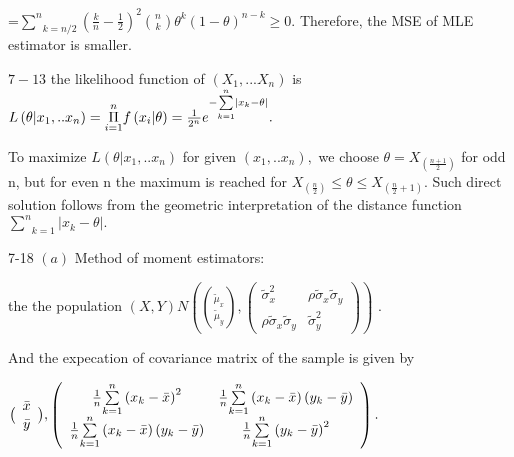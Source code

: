 \documentclass{article}
\begin{document}
=$\underset{k=n/2}{\overset{n}{\sum }}\left( \frac{k}{n}-\frac{1}{2}\right)
^{2}\binom{n}{k}\theta ^{k}\left( 1-\theta \right) ^{n-k}\geq 0.$ Therefore,
the MSE of MLE estimator is smaller.

$7-13$ the likelihood function of $\left( X_{1},...X_{n}\right) $ is $%
L\left( \theta |x_{1},..x_{n}\right) =\underset{i=1}{\overset{n}{\Pi }}%
f\left( x_{i}|\theta \right) =\frac{1}{2^{n}}e^{-\underset{k=1}{\overset{n}{%
\sum }}\left\vert x_{k}-\theta \right\vert }.$

To maximize $L\left( \theta |x_{1},..x_{n}\right) $ for given $\left(
x_{1},..x_{n}\right) ,$ we choose $\theta =X_{\left( \frac{n+1}{2}\right) }$
for odd n, but for even n the maximum is reached for $X_{\left( \frac{n}{2}%
\right) }\leq \theta \leq X_{\left( \frac{n}{2}+1\right) }.$ Such direct
solution follows from the geometric interpretation of the distance function $%
\underset{k=1}{\overset{n}{\sum }}\left\vert x_{k}-\theta \right\vert .$

7-18 $\left( a\right) $ Method of moment estimators: 

the the population $\left( X,Y\right) $$N\left( \binom{\tilde{\mu%
}_{x}}{\tilde{\mu}_{y}},\left( 
\begin{array}{cc}
\tilde{\sigma}_{x}^{2} & \rho \tilde{\sigma}_{x}\tilde{\sigma}_{y} \\ 
\rho \tilde{\sigma}_{x}\tilde{\sigma}_{y} & \tilde{\sigma}_{y}^{2}%
\end{array}%
\right) \right) $ .

And the expecation of covariance matrix of the sample is given by

$\binom{%
\begin{array}{c}
\bar{x} \\ 
\end{array}%
}{%
\begin{array}{c}
\bar{y} \\ 
\end{array}%
},\left( 
\begin{array}{cc}
\frac{1}{n}\underset{k=1}{\overset{n}{\sum }}\left( x_{k}-\bar{x}\right) ^{2}
& \frac{1}{n}\underset{k=1}{\overset{n}{\sum }}\left( x_{k}-\bar{x}\right)
\left( y_{k}-\bar{y}\right)  \\ 
\frac{1}{n}\underset{k=1}{\overset{n}{\sum }}\left( x_{k}-\bar{x}\right)
\left( y_{k}-\bar{y}\right)  & \frac{1}{n}\underset{k=1}{\overset{n}{\sum }}%
\left( y_{k}-\bar{y}\right) ^{2}%
\end{array}%
\right) .$
\end{document}
